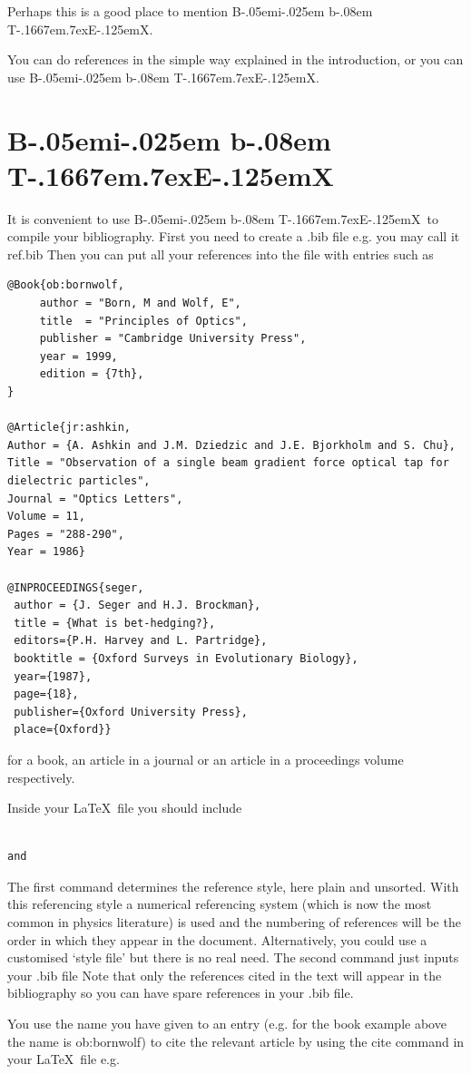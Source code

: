 \documentclass[12pt,a4paper]{report}
\def\BibTeX{{\rm B\kern-.05em{\sc i\kern-.025em b}\kern-.08em
    T\kern-.1667em\lower.7ex\hbox{E}\kern-.125emX}}
\begin{document}
Perhaps this is a good place to mention \BibTeX.

You can do references in the simple way explained in the introduction,
or you can use \BibTeX.


\section{\BibTeX}
\label{sec:bibtex}

It is convenient to use \BibTeX\ to compile your bibliography.  First
you need to create a .bib file e.g.  you may call it ref.bib Then you
can put all your references into the file with entries such as
\begin{verbatim}
@Book{ob:bornwolf,
     author = "Born, M and Wolf, E",
     title  = "Principles of Optics",
     publisher = "Cambridge University Press",
     year = 1999,
     edition = {7th},
}

@Article{jr:ashkin,
Author = {A. Ashkin and J.M. Dziedzic and J.E. Bjorkholm and S. Chu},
Title = "Observation of a single beam gradient force optical tap for 
dielectric particles",
Journal = "Optics Letters",
Volume = 11,
Pages = "288-290",
Year = 1986}

@INPROCEEDINGS{seger,
 author = {J. Seger and H.J. Brockman},
 title = {What is bet-hedging?},
 editors={P.H. Harvey and L. Partridge},
 booktitle = {Oxford Surveys in Evolutionary Biology},
 year={1987},
 page={18},
 publisher={Oxford University Press},
 place={Oxford}}
\end{verbatim}
for a book, an article in a journal or an article in a proceedings volume
respectively.

Inside your \LaTeX\ file
you should include 
\begin{verbatim}
                      
and

\end{verbatim}
The first command determines the reference style, here plain and 
unsorted. With this referencing style 
a numerical referencing system (which is now the most
common in physics literature) is used and the numbering of references
will be the order in which they appear in the document. Alternatively, 
you could use
a customised `style file' but there is no real need.  The second
command just inputs your .bib file Note that only the references cited
in the text will appear in the bibliography so you can have spare
references in your .bib file.


You use the name you have given to an entry (e.g.
for the book example above the name is ob:bornwolf)
to cite the relevant article
by using the cite command in your \LaTeX\ file e.g. \cite{ob:bornwolf}
\end{document}
